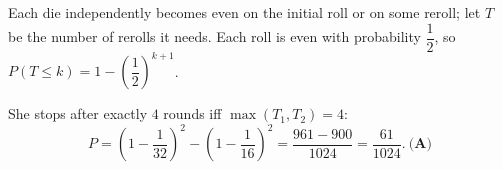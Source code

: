 Each die independently becomes even on the initial roll or on some reroll; let $T$ be the number of rerolls it needs. Each roll is even with probability $\dfrac12$, so $P(T\le k)=1-\left(\dfrac12\right)^{k+1}$.

She stops after exactly $4$ rounds iff $\max(T_1,T_2)=4$:
\[P=\left(1-\dfrac1{32}\right)^2-\left(1-\dfrac1{16}\right)^2=\dfrac{961-900}{1024}=\dfrac{61}{1024}.\ \textbf{(A)}\]
